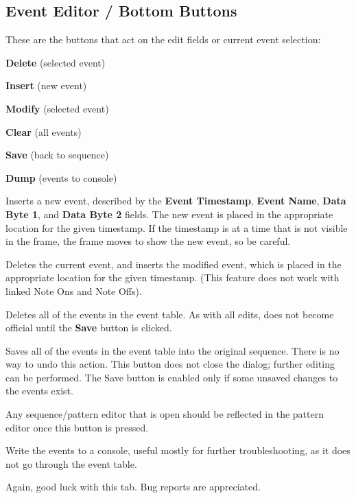 \subsection{Event Editor / Bottom Buttons}
\label{subsec:event_editor_buttons}

   These are the buttons that act on the edit fields or current event
   selection:

   \begin{enumber}
      \item \textbf{Delete} (selected event)
      \item \textbf{Insert} (new event)
      \item \textbf{Modify} (selected event)
      \item \textbf{Clear} (all events)
      \item \textbf{Save} (back to sequence)
      \item \textbf{Dump} (events to console)
   \end{enumber}

   \setcounter{ItemCounter}{0}      %

   Inserts a new event, described by the 
   \textbf{Event Timestamp},
   \textbf{Event Name},
   \textbf{Data Byte 1}, and
   \textbf{Data Byte 2} fields.
   The new event is placed in the appropriate location for the given timestamp.
   If the timestamp is at a time that is not visible in the frame, the frame
   moves to show the new event, so be careful.

   Deletes the current event, and inserts the modified event,
   which is placed in the appropriate location for the given
   timestamp.  (This feature does not work with linked Note Ons and Note Offs).

   Deletes all of the events in the event table.
   As with all edits, does not become official until the \textbf{Save} button
   is clicked.

   Saves all of the events in the event table into the original sequence.
   There is no way to undo this action.
   This button does not close the dialog; further
   editing can be performed.  The Save button is enabled only if
   some unsaved changes to the events exist.

   Any sequence/pattern editor that is open should be reflected
   in the pattern editor once this button is pressed.

   Write the events to a console, useful mostly for further troubleshooting, as
   it does not go through the event table.

   Again, good luck with this tab.  Bug reports are appreciated.

